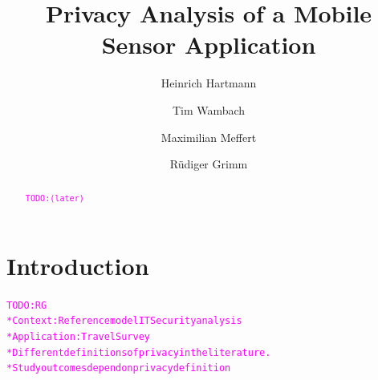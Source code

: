 \documentclass[runningheads,a4paper]{llncs}
\newcommand{\TODO}[1]{\begin{alltt}\textcolor{magenta}{TODO: #1}\end{alltt}}
\begin{document}

\title{Privacy Analysis of a Mobile Sensor Application}
\author{Heinrich Hartmann \and Tim Wambach \and Maximilian Meffert \and R\"udiger Grimm}
\maketitle


\begin{abstract}

\TODO{(later)}


\end{abstract}


\section{Introduction}

\TODO{RG\\
* Context: Reference model IT Security analysis\\
* Application: Travel Survey\\
* Different definitions of privacy in the literature.\\
* Study outcomes depend on privacy definition
}
\end{document}
